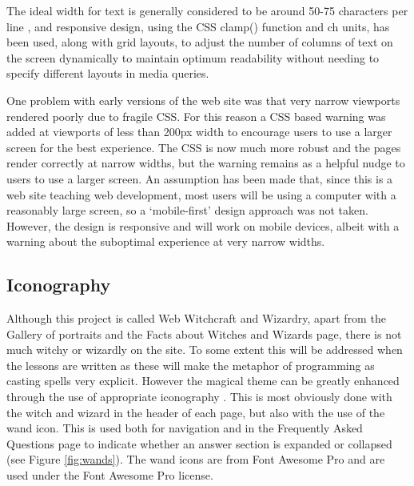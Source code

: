 \documentclass[a4paper, 12pt]{article}
\begin{document}
The ideal width for text is generally considered to be around 50-75 characters per line \citep{bringhurst2013elements}, and responsive design, using the CSS clamp() function and ch units, has been used, along with grid layouts, to adjust the number of columns of text on the screen dynamically to maintain optimum readability without needing to specify different layouts in media queries.

One problem with early versions of the web site was that very narrow viewports rendered poorly due to fragile CSS. For this reason a CSS based warning was added at viewports of less than 200px width to encourage users to use a larger screen for the best experience. The CSS is now much more robust and the pages render correctly at narrow widths, but the warning remains as a helpful nudge to users to use a larger screen. An assumption has been made that, since this is a web site teaching web development, most users will be using a computer with a reasonably large screen, so a `mobile-first' design approach was not taken. However, the design is responsive and will work on mobile devices, albeit with a warning about the suboptimal experience at very narrow widths.

\subsection{Iconography}
Although this project is called Web Witchcraft and Wizardry, apart from the Gallery of portraits and the Facts about Witches and Wizards page, there is not much witchy or wizardly on the site. To some extent this will be addressed when the lessons are written as these will make the metaphor of programming as casting spells very explicit. However the magical theme can be greatly enhanced through the use of appropriate iconography \citep{horton1994icon}. This is most obviously done with the witch and wizard in the header of each page, but also with the use of the wand icon. This is used both for navigation and in the Frequently Asked Questions page to indicate whether an answer section is expanded or collapsed (see Figure \ref{fig:wands}). The wand icons are from Font Awesome Pro \citep{fontawesome2026} and are used under the Font Awesome Pro license.
\end{document}
